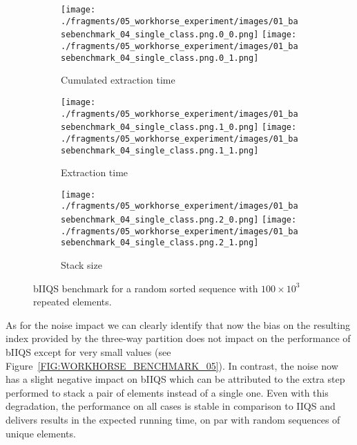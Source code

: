 \begin{figure}
    \centering
    \begin{subfigure}[b]{\textwidth}
        \centering
        \texttt{[image: ./fragments/05\_workhorse\_experiment/images/01\_basebenchmark\_04\_single\_class.png.0\_0.png]}
        \texttt{[image: ./fragments/05\_workhorse\_experiment/images/01\_basebenchmark\_04\_single\_class.png.0\_1.png]}
        \caption{Cumulated extraction time}
        \label{FIG:WORKHORSE_BENCHMARK_04__0_0}
    \end{subfigure}

    \begin{subfigure}[b]{\textwidth}
        \centering
        \texttt{[image: ./fragments/05\_workhorse\_experiment/images/01\_basebenchmark\_04\_single\_class.png.1\_0.png]}
        \texttt{[image: ./fragments/05\_workhorse\_experiment/images/01\_basebenchmark\_04\_single\_class.png.1\_1.png]}
        \caption{Extraction time}
        \label{FIG:WORKHORSE_BENCHMARK_04__0_0}
    \end{subfigure}

    \begin{subfigure}[b]{\textwidth}
        \centering
        \texttt{[image: ./fragments/05\_workhorse\_experiment/images/01\_basebenchmark\_04\_single\_class.png.2\_0.png]}
        \texttt{[image: ./fragments/05\_workhorse\_experiment/images/01\_basebenchmark\_04\_single\_class.png.2\_1.png]}
        \caption{Stack size}
        \label{FIG:WORKHORSE_BENCHMARK_04__0_0}
    \end{subfigure}
    
    \caption{bIIQS benchmark for a random sorted sequence with $100\times10^3$ repeated elements.}
    \label{FIG:WORKHORSE_BENCHMARK_04}
\end{figure}


As for the noise impact we can clearly identify that now the bias on the resulting index provided by the three-way partition does not impact on the performance of bIIQS except for very small values (see Figure~\ref{FIG:WORKHORSE_BENCHMARK_05}). In contrast, the noise now has a slight negative impact on bIIQS which can be attributed to the extra step performed to stack a pair of elements instead of a single one. Even with this degradation, the performance on all cases is stable in comparison to IIQS and delivers results in the expected running time, on par with random sequences of unique elements.\\


